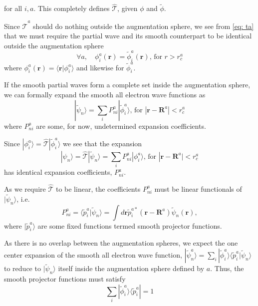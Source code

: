 \documentclass[a4paper]{article}
\newcommand{\f}[1]{\mathbf{#1}}
\newcommand{\s}[1]{\tilde{#1}}
\newcommand{\T}{\hat{\mathcal{T}}}
\newcommand{\bra}[1]{\langle #1 |}
\newcommand{\ket}[1]{| #1 \rangle}
\newcommand{\braket}[2]{\langle #1 | #2 \rangle}
\begin{document}
%
for all $i,a$. This completely defines $\T$, given $\phi$ and $\s{\phi}$.
\par Since $\T^a$
should do nothing outside the augmentation sphere, we see from
\ref{eq: ta} that we must require the partial wave and its
smooth counterpart to be identical outside the augmentation sphere
%
\begin{equation*}
\forall a, \quad \phi_i^a(\f{r})=\s{\phi}_i^a(\f{r})\text{, for } r>r_c^a
\end{equation*}
%
where $\phi_i^a(\f{r})=\braket{\f{r}}{\phi_i^a}$ and likewise for
$\s{\phi}_i^a$.
\par If the smooth partial waves form a complete set inside the
augmentation sphere, we can formally expand the smooth all electron
wave functions as
%
\begin{equation}\label{eq: smooth psi expansion}
\ket{\s{\psi}_n} = \sum_i P_{ni}^a \ket{\s{\phi}_i^a} \text{, for } |\f{r}-\f{R}^a|<r_c^a
\end{equation}
%
where $P_{ni}^a$ are some, for now, undetermined expansion
coefficients.
\par Since $\ket{\phi_i^a} =
\T\ket{\s{\phi}_i^a}$ we see that the expansion
%
\begin{equation}\label{eq: psi expansion}
\ket{\psi_n} = \T\ket{\s{\psi}_n} = \sum_i P_{ni}^a \ket{\phi_i^a} \text{, for } |\f{r}-\f{R}^a|<r_c^a
\end{equation}
%
has identical expansion coefficients, $P_{ni}^a$.
\par As we require $\T$ to be linear, the coefficients $P_{ni}^a$ must be
linear functionals of $\ket{\s{\psi}_n}$, i.e.
%
\begin{equation}\label{eq: P expansion coeff}
P_{ni}^a = \braket{\s{p}_i^a}{\s{\psi}_n} = \int d\f{r}
\s{p}_i^{a*}(\f{r}-\f{R}^a)\s{\psi}_n(\f{r}),
\end{equation}
%
where $\ket{\s{p}_i^a}$ are some fixed functions termed smooth
projector functions.
\par As there is no overlap between the augmentation spheres, we
expect the one center expansion of the smooth all electron wave
function, $\ket{\s{\psi}^a_n} = \sum_i
\ket{\s{\phi}_i^a}\braket{\s{p}_i^a}{\s{\psi}_n}$ to reduce to
$\ket{\s{\psi}_n}$ itself inside the augmentation sphere defined by
$a$. Thus, the smooth projector functions must satisfy
%
\begin{equation}\label{eq: phi p completeness}
\sum_i \ket{\s{\phi}_i^a}\bra{\s{p}_i^a} = 1 %
\end{equation}
\end{document}
